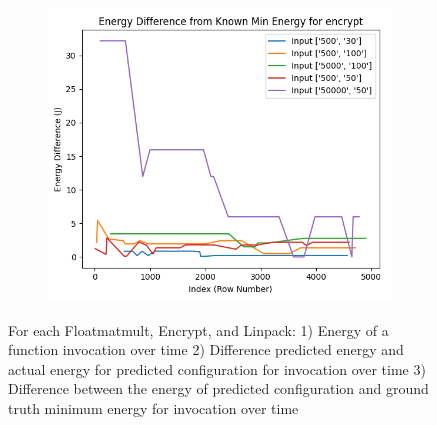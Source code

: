 \documentclass[times, 10pt,twocolumn]{article}
\begin{document}
\begin{figure}[ht]
\begin{subfigure}[b]{0.3\textwidth}
     \caption{}
     \label{fig:encrypt_energy_diff}
   \end{subfigure}
   \hfill
   \begin{subfigure}[b]{0.3\textwidth}
      \includegraphics[width=\textwidth]{imgs/final_experiment_plots/model_analysis/measurement_data_analysis/encrypt_compare_min.png}
     \caption{}
     \label{fig:encrypt_compare_min}
   \end{subfigure}

   \caption{For each Floatmatmult, Encrypt, and Linpack: 1) Energy of a function invocation over time 2) Difference predicted energy and actual energy for predicted configuration for invocation over time 3) Difference between the energy of predicted configuration and ground truth minimum energy for invocation over time}
   \label{fig:model_performance_measurement_study_}
\end{figure}
\end{document}
